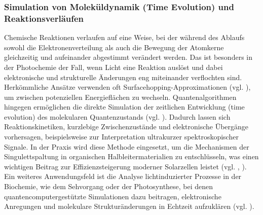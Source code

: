 {\subsubsection{Simulation von Moleküldynamik (Time Evolution) und Reaktionsverläufen}

Chemische Reaktionen verlaufen auf eine Weise, bei der während des Ablaufs sowohl die Elektronenverteilung als auch die Bewegung der Atomkerne gleichzeitig und aufeinander abgestimmt verändert werden. Das ist besonders in der Photochemie der Fall, wenn Licht eine Reaktion auslöst und dabei elektronische und strukturelle Änderungen eng miteinander verflochten sind. Herkömmliche Ansätze verwenden oft Surfacehopping-Approximationen (vgl. \cite{barbattiNonadiabaticDynamicsTrajectory2011}), um zwischen potenziellen Energieflächen zu wechseln. Quantenalgorithmen hingegen ermöglichen die direkte Simulation der zeitlichen Entwicklung (time evolution) des molekularen Quantenzustands (vgl. \cite{bauer_quantum_2020}). Dadurch lassen sich Reaktionskinetiken, kurzlebige Zwischenzustände und elektronische Übergänge vorhersagen, beispielsweise zur Interpretation ultrakurzer spektroskopischer Signale.
In der Praxis wird diese Methode eingesetzt, um die Mechanismen der Singulettspaltung in organischen Halbleitermaterialien zu entschlüsseln, was einen wichtigen Beitrag zur Effizienzsteigerung moderner Solarzellen leistet (vgl. \cite{motlagh_quantum_2025}, \cite{baldacchino_singlet_2022}). Ein weiteres Anwendungsfeld ist die Analyse lichtinduzierter Prozesse in der Biochemie, wie dem Sehvorgang oder der Photosynthese, bei denen quantencomputergestützte Simulationen dazu beitragen, elektronische Anregungen und molekulare Strukturänderungen in Echtzeit aufzuklären (vgl. \cite{macdonell_predicting_2023}).
}
